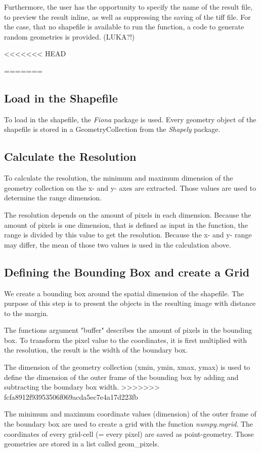 \documentclass[10pt, a4paper]{article}
\begin{document}
Furthermore, the user has the opportunity to specify the name of the result file, to preview the result inline, as well as suppressing the saving of the tiff file.
For the case, that no shapefile is available to run the function, a code to generate random geometries is provided. (LUKA?!)


<<<<<<< HEAD


=======
\subsection{Load in the Shapefile}
To load in the shapefile, the \textit{Fiona} package is used. Every geometry object of the shapefile is stored in a GeometryCollection from the \emph{Shapely} package.

\subsection{Calculate the Resolution}
To calculate the resolution, the minimum and maximum dimension of the geometry collection on the x- and y- axes are extracted.  Those values are used to determine the range dimension. 

The resolution depends on the amount of pixels in each dimension. Because the amount of pixels is one dimension, that is defined as input in the function, the range is divided by this value to get the resolution. Because the x- and y- range may differ, the mean of those two values is used in the calculation above. 

\subsection{Defining the Bounding Box and create a Grid}
We create a bounding box around the spatial dimension of the shapefile. The purpose of this step is to present the objects in the resulting image with distance to the margin.

The functions argument "buffer" describes the amount of pixels in the bounding box.  To transform the pixel value to the coordinates, it is first multiplied with the resolution, the result is the width of the boundary box.

The dimension of the geometry collection (xmin, ymin, xmax, ymax) is used to define the dimension of the outer frame of the bounding box by adding and subtracting the boundary box width.
>>>>>>> fcfa8912f93953506f069acda5ec7e4a17d223fb

The minimum and maximum coordinate values (dimension) of the outer frame of the boundary box are used to create a grid with the function \textit{numpy.mgrid}. The coordinates of every grid-cell (= every pixel) are saved as point-geometry. Those geometries are stored in a list called geom\_pixels.
\end{document}

